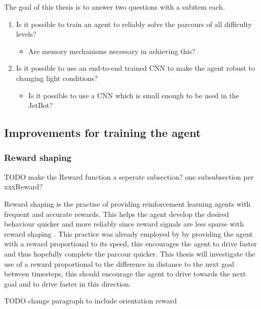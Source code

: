 The goal of this thesis is to answer two questions with a subitem each.
\begin{enumerate}
     \item Is it possible to train an agent to reliably solve the parcours of all difficulty levels?
           \begin{itemize}
                \item Are memory mechanisms necessary in achieving this?
           \end{itemize}
     \item Is it possible to use an end-to-end trained CNN to make the agent robust to changing light conditions?
           \begin{itemize}
                \item Is it possible to use a CNN which is small enough to be used in the JetBot?
           \end{itemize}
\end{enumerate}

\subsection{Improvements for training the agent}

\subsubsection{Reward shaping}

TODO make the Reward function a seperate subsection?
one subsubsection per xxxReward?


Reward shaping is the practise of providing reinforcement learning agents with frequent and accurate rewards. This helps the agent develop the desired behaviour quicker and more reliably since reward signals are less sparse with reward shaping \autocite{drl_for_ad}. This practice was already employed by \autocite{maximilian} by providing the agent with a reward proportional to its speed, this encourages the agent to drive faster and thus hopefully complete the parcour quicker. This thesis will investigate the use of a reward proportional to the difference in distance to the next goal between timesteps, this should encourage the agent to drive towards the next goal and to drive faster in this direction.

TODO change paragraph to include orientation reward

